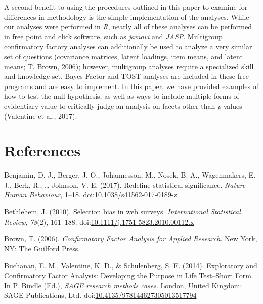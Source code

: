 \documentclass[english,man, mask]{apa6}
\theoremstyle{definition}
\theoremstyle{definition}
\theoremstyle{definition}
\theoremstyle{remark}
\begin{document}
A second benefit to using the procedures outlined in this paper to
examine for differences in methodology is the simple implementation of
the analyses. While our analyses were performed in \emph{R}, nearly all
of these analyses can be performed in free point and click software,
such as \emph{jamovi} and \emph{JASP}. Multigroup confirmatory factory
analyses can additionally be used to analyze a very similar set of
questions (covariance matrices, latent loadings, item means, and latent
means; T. Brown, 2006); however, multigroup analyses require a
specialized skill and knowledge set. Bayes Factor and TOST analyses are
included in these free programs and are easy to implement. In this
paper, we have provided examples of how to test the null hypothesis, as
well as ways to include multiple forms of evidentiary value to
critically judge an analysis on facets other than \emph{p}-values
(Valentine et al., 2017).

\newpage

\section{References}\label{references}

\setlength{\parindent}{-0.5in} \setlength{\leftskip}{0.5in}

\hypertarget{refs}{}
\hypertarget{ref-Benjamin2017}{}
Benjamin, D. J., Berger, J. O., Johannesson, M., Nosek, B. A.,
Wagenmakers, E.-J., Berk, R., \ldots{} Johnson, V. E. (2017). Redefine
statistical significance. \emph{Nature Human Behaviour}, 1--18.
doi:\href{https://doi.org/10.1038/s41562-017-0189-z}{10.1038/s41562-017-0189-z}

\hypertarget{ref-Bethlehem2010}{}
Bethlehem, J. (2010). Selection bias in web surveys. \emph{International
Statistical Review}, \emph{78}(2), 161--188.
doi:\href{https://doi.org/10.1111/j.1751-5823.2010.00112.x}{10.1111/j.1751-5823.2010.00112.x}

\hypertarget{ref-Brown2006}{}
Brown, T. (2006). \emph{Confirmatory Factor Analysis for Applied
Research}. New York, NY: The Guilford Press.

\hypertarget{ref-Buchanan2014}{}
Buchanan, E. M., Valentine, K. D., \& Schulenberg, S. E. (2014).
Exploratory and Confirmatory Factor Analysis: Developing the Purpose in
Life Test--Short Form. In P. Bindle (Ed.), \emph{SAGE research methods
cases}. London, United Kingdom: SAGE Publications, Ltd.
doi:\href{https://doi.org/10.4135/978144627305013517794}{10.4135/978144627305013517794}
\end{document}
